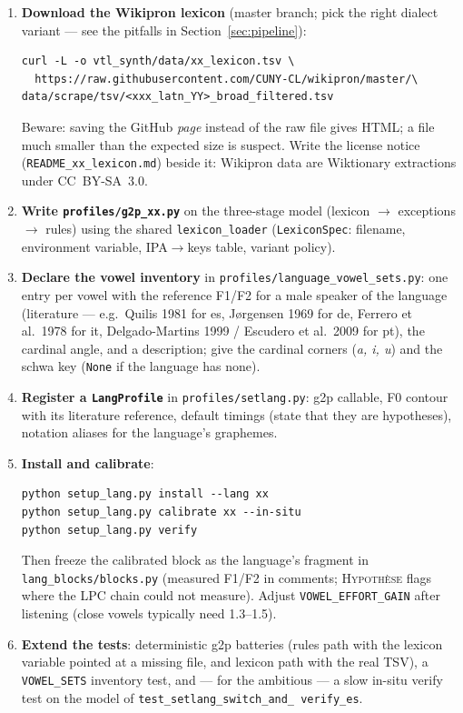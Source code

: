 \documentclass[11pt,a4paper]{article}
\newcommand{\code}[1]{\texttt{#1}}
\begin{document}
\begin{enumerate}
\item \textbf{Download the Wikipron lexicon} (master branch; pick the
      right dialect variant --- see the pitfalls in
      Section~\ref{sec:pipeline}):
\begin{verbatim}
curl -L -o vtl_synth/data/xx_lexicon.tsv \
  https://raw.githubusercontent.com/CUNY-CL/wikipron/master/\
data/scrape/tsv/<xxx_latn_YY>_broad_filtered.tsv
\end{verbatim}
      Beware: saving the GitHub \emph{page} instead of the raw file
      gives HTML; a file much smaller than the expected size is
      suspect. Write the license notice
      (\code{README\_xx\_lexicon.md}) beside it: Wikipron data are
      Wiktionary extractions under CC~BY-SA~3.0.
\item \textbf{Write \code{profiles/g2p\_xx.py}} on the three-stage
      model (lexicon $\rightarrow$ exceptions $\rightarrow$ rules)
      using the shared \code{lexicon\_loader} (\code{LexiconSpec}:
      filename, environment variable, IPA$\rightarrow$keys table,
      variant policy).
\item \textbf{Declare the vowel inventory} in
      \code{profiles/language\_vowel\_sets.py}: one entry per vowel
      with the reference F1/F2 for a male speaker of the language
      (literature --- e.g.\ Quilis 1981 for es, J{\o}rgensen 1969 for
      de, Ferrero et al.\ 1978 for it, Delgado-Martins 1999 /
      Escudero et al.\ 2009 for pt), the cardinal angle, and a
      description; give the cardinal corners (\emph{a, i, u}) and the
      schwa key (\texttt{None} if the language has none).
\item \textbf{Register a \code{LangProfile}} in
      \code{profiles/setlang.py}: g2p callable, F0 contour with its
      literature reference, default timings (state that they are
      hypotheses), notation aliases for the language's graphemes.
\item \textbf{Install and calibrate}:
\begin{verbatim}
python setup_lang.py install --lang xx
python setup_lang.py calibrate xx --in-situ
python setup_lang.py verify
\end{verbatim}
      Then freeze the calibrated block as the language's fragment in
      \code{lang\_blocks/blocks.py} (measured F1/F2 in comments;
      \textsc{Hypoth\`ese} flags where the LPC chain could not
      measure). Adjust \code{VOWEL\_EFFORT\_GAIN} after listening
      (close vowels typically need 1.3--1.5).
\item \textbf{Extend the tests}: deterministic g2p batteries
      (rules path with the lexicon variable pointed at a missing
      file, and lexicon path with the real TSV), a
      \code{VOWEL\_SETS} inventory test, and --- for the ambitious
      --- a slow in-situ verify test on the model of
      \code{test\_setlang\_\allowbreak switch\_and\_\allowbreak
      verify\_es}.
\end{enumerate}
\end{document}
